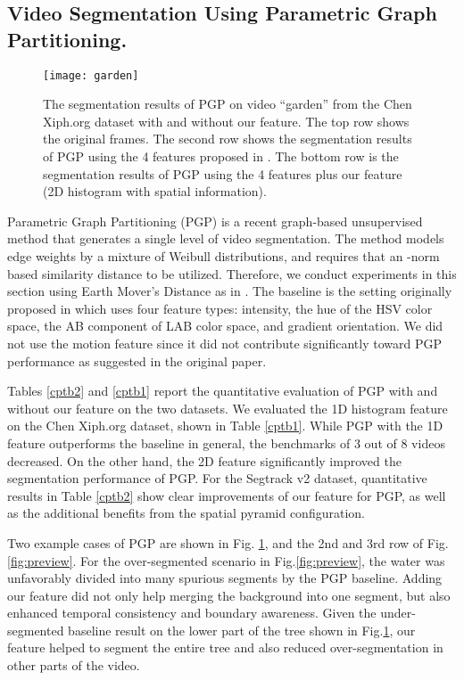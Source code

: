 \documentclass[runningheads]{llncs}
\begin{document}
\subsection{Video Segmentation Using Parametric Graph Partitioning.}

\begin{figure}[h]
\begin{center}
\texttt{[image: garden]}
\end{center}
\caption{The segmentation results of PGP on video ``garden'' from the Chen Xiph.org dataset with and without our feature. The top row shows the original frames. The second row shows the segmentation results of PGP using the 4 features proposed in \cite{Yu_2015_ICCV}. The bottom row is the segmentation results of PGP using the 4 features plus our feature (2D histogram with spatial information).}
\label{fig:cpygd}
\end{figure}

Parametric Graph Partitioning (PGP) \cite{Yu_2015_ICCV} is a recent graph-based unsupervised method that generates a single level of video segmentation. The method models edge weights by a mixture of Weibull distributions, and requires that an -norm based similarity distance to be utilized. Therefore, we conduct experiments in this section using Earth Mover's Distance as in \cite{Yu_2015_ICCV}. 
The baseline is the setting originally proposed in \cite{Yu_2015_ICCV} which uses four feature types: intensity, the hue of the HSV color space, the AB component of LAB color space, and gradient orientation. We did not use the motion feature since it did not contribute  significantly toward PGP performance as suggested in the original paper. 

Tables \ref{cptb2} and \ref{cptb1} report the quantitative evaluation of PGP with and without our feature on the two datasets.  
We evaluated the 1D histogram feature on the Chen Xiph.org dataset, shown in Table \ref{cptb1}. While PGP with the 1D feature outperforms the baseline in general, the benchmarks of 3 out of 8 videos decreased. On the other hand, the 2D feature significantly improved the segmentation performance of PGP. For the Segtrack v2 dataset, quantitative results in Table \ref{cptb2} show clear improvements of our feature for PGP, as well as the additional benefits from the spatial pyramid configuration.

Two example cases of PGP are shown in Fig. \ref{fig:cpygd}, and the 2nd and 3rd row of Fig. \ref{fig:preview}. For the over-segmented scenario in Fig.\ref{fig:preview}, the water was unfavorably divided into many spurious segments by the PGP baseline. Adding our feature did not only help merging the background into one segment, but also enhanced temporal consistency and boundary awareness. Given the under-segmented baseline result on the lower part of the tree shown in Fig.\ref{fig:cpygd}, our feature helped to segment the entire tree and also reduced over-segmentation in other parts of the video.
\end{document}

